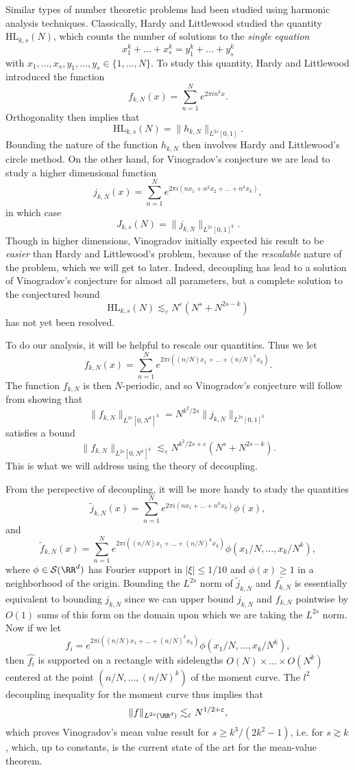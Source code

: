 Similar types of number theoretic problems had been studied using harmonic analysis techniques. Classically, Hardy and Littlewood studied the quantity $\text{HL}_{k,s}(N)$, which counts the number of solutions to the \emph{single equation}
%
\[ x_1^k + \dots + x_s^k = y_1^k + \dots + y_s^k \]
%
with $x_1,\dots,x_s,y_1,\dots,y_s \in \{ 1, \dots, N \}$. To study this quantity, Hardy and Littlewood introduced the function
%
\[ f_{k,N}(x) = \sum_{n = 1}^N e^{2 \pi i n^k x}. \]
%
Orthogonality then implies that
%
\[ \text{HL}_{k,s}(N) = \| h_{k,N} \|_{L^{2s}[0,1]}. \]
%
Bounding the nature of the function $h_{k,N}$ then involves Hardy and Littlewood's circle method. On the other hand, for Vinogradov's conjecture we are lead to study a higher dimensional function
%
\[ j_{k,N}(x) = \sum_{n = 1}^N e^{2 \pi i (n x_1 + n^2 x_2 + \dots + n^k x_k)}, \]
%
in which case
%
\[ J_{k,s}(N) = \| j_{k,N} \|_{L^{2s}[0,1]^k}. \]
%
Though in higher dimensions, Vinogradov initially expected his result to be \emph{easier} than Hardy and Littlewood's problem, because of the \emph{rescalable} nature of the problem, which we will get to later. Indeed, decoupling has lead to a solution of Vinogradov's conjecture for almost all parameters, but a complete solution to the conjectured bound
%
\[ \text{HL}_{k,s}(N) \lesssim_\varepsilon N^\varepsilon ( N^s + N^{2s - k} ) \]
%
has not yet been resolved.

To do our analysis, it will be helpful to rescale our quantities. Thus we let
%
\[ f_{k,N}(x) = \sum_{n = 1}^N e^{2 \pi i ( (n/N) x_1 + \dots + (n/N)^k x_k )}. \]
%
The function $f_{k,N}$ is then $N$-periodic, and so Vinogradov's conjecture will follow from showing that
%
\[ \| f_{k,N} \|_{L^{2s}[0,N^k]^k} = N^{k^2/2s} \| j_{k,N} \|_{L^{2s}[0,1]^k} \]
%
satisfies a bound
%
\[ \| f_{k,N} \|_{L^{2s}[0,N^k]^k} \lesssim_\varepsilon N^{k^2/2s + \varepsilon} (N^s + N^{2s - k}). \]
%
This is what we will address using the theory of decoupling.

From the perspective of decoupling, it will be more handy to study the quantities
%
\[ \tilde{j}_{k,N}(x) = \sum_{n = 1}^N e^{2 \pi i (n x_1 + \dots + n^k x_k)} \phi(x), \]
%
and
%
\[ \tilde{f}_{k,N}(x) = \sum_{n = 1}^N e^{2 \pi i ((n/N) x_1 + \dots + (n/N)^k x_k)} \phi(x_1 / N, \dots, x_k / N^k), \]
%
where $\phi \in \mathcal{S}(\RR^d)$ has Fourier support in $|\xi| \leq 1/10$ and $\phi(x) \geq 1$ in a neighborhood of the origin. Bounding the $L^{2s}$ norm of $\tilde{j}_{k,N}$ and $\tilde{f_{k,N}}$ is essentially equivalent to bounding $j_{k,N}$ since we can upper bound $j_{k,N}$ and $f_{k,N}$ pointwise by $O(1)$ sums of this form on the domain upon which we are taking the $L^{2s}$ norm. Now if we let
%
\[ f_i = e^{2 \pi i ((n/N) x_1 + \dots + (n/N)^k x_k)} \phi(x_1 / N, \dots, x_k / N^k), \]
%
then $\widehat{f_i}$ is supported on a rectangle with sidelengths $O(N) \times \dots \times O(N^k)$ centered at the point $(n/N, \dots, (n/N)^k)$ of the moment curve. The $l^2$ decoupling inequality for the moment curve thus implies that
%
\[ \| f \|_{L^{2s}(\RR^d)} \lesssim_\varepsilon N^{1/2 + \varepsilon}, \]
%
which proves Vinogradov's mean value result for $s \geq k^3 / (2k^2 - 1)$, i.e. for $s \gtrsim k$, which, up to constants, is the current state of the art for the mean-value theorem.